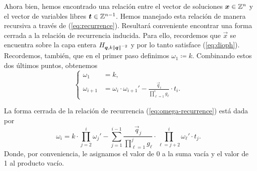 Ahora bien, hemos encontrado una relación entre el vector de soluciones $\boldsymbol{x} \in \mathbb{Z}^n$ y el
vector de variables libres $\boldsymbol{t} \in \mathbb{Z}^{n-1}$. Hemos manejado esta relación de manera recursiva
a través de (\ref{eq:recurrence}). Resultará conveniente encontrar una forma cerrada a la relación
de recurrencia inducida. Para ello, recordemos que $\vec{x}$ se encuentra sobre la capa entera
$H_{\boldsymbol{q}, k\left\lVert \boldsymbol{q} \right\rVert^{-2}}$ y por lo tanto satisface (\ref{eq:dioph}). Recordemos, también,
que en el primer paso definimos $\omega_1 \coloneq k$. Combinando estos dos últimos puntos, obtenemos
\begin{equation}
	\label{eq:omega-recurrence}
	\begin{cases}
		\omega_1 &= k, \\
		\omega_{i + 1} &= \omega_i \cdot \omega_{i + 1}' - \frac{\vec{q}_i}{\prod_{\ell=1}^{i}g_\ell} \cdot t_i.
	\end{cases}
\end{equation}
\begin{lemma}
	La forma cerrada de la relación de recurrencia (\ref{eq:omega-recurrence}) está dada por
	\begin{equation}
		\label{eq:omega-formula}
		\omega_i =
		k \cdot \prod_{j=2}^{i} \omega_j'
		- \sum_{j=1}^{i - 1}\frac{\vec{q}_j}{\prod_{\ell=1}^{j}g_\ell}
		\cdot \prod_{\ell=j+2}^{i}\omega_\ell' \cdot t_j.
	\end{equation}
	Donde, por conveniencia, le asignamos el valor de 0 a la suma vacía y el valor de 1 al producto
	vacío.
\end{lemma}
